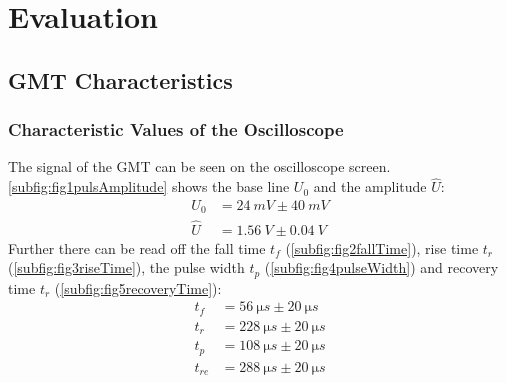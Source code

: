 \chapter{Evaluation}
%
\section{GMT Characteristics}
%
\subsection{Characteristic Values of the Oscilloscope}
%
The signal of the GMT can be seen on the oscilloscope screen. \cref{subfig:fig1pulsAmplitude} shows the base line \(U_{0}\) and
the amplitude \(\hat{U}\):
%
\begin{align}
U_{0}   &=  \SI{24}{mV} \pm \SI{40}{mV} \\
\hat{U} &=  \SI{1,56}{V} \pm \SI{0,04}{V}
\end{align}
%
Further there can be read off the fall time \(t_{f}\) (\cref{subfig:fig2fallTime}), rise time \(t_{r}\) (\cref{subfig:fig3riseTime}), the pulse width \(t_{p}\)
(\cref{subfig:fig4pulseWidth}) and recovery time \(t_{r}\) (\cref{subfig:fig5recoveryTime}):
\begin{align}
t_{f}   &=  \SI{56}{\micro s} \pm \SI{20}{\micro s} \\
t_{r}   &=  \SI{228}{\micro s} \pm \SI{20}{\micro s} \\
t_{p}   &=  \SI{108}{\micro s} \pm \SI{20}{\micro s} \\
t_{re}  &=  \SI{288}{\micro s} \pm \SI{20}{\micro s}
\end{align}
%
